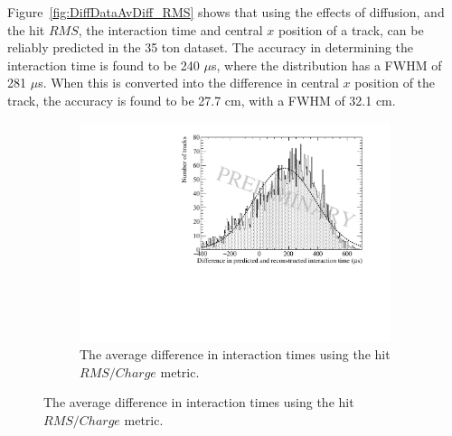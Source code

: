 Figure~\ref{fig:DiffDataAvDiff_RMS} shows that using the effects of diffusion, and the hit $RMS$, the interaction time and central $x$ position of a track, can be reliably predicted in the 35 ton dataset. The accuracy in determining the interaction time is found to be 240 $\mu$s, where the distribution has a FWHM of 281 $\mu$s. When this is converted into the difference in central $x$ position of the track, the accuracy is found to be 27.7 cm, with a FWHM of 32.1 cm. \\

\begin{figure}[h!]
  \centering
  \begin{subfigure}{0.6\textwidth}
    \centering
    \includegraphics[width=\textwidth]{Data_AvTimeDiff_RMS_Int}
    \caption{The average difference in interaction times using the hit $RMS/Charge$ metric.}
    \label{fig:DiffDataAvDiff_RMS_Int_T}
  \end{subfigure}


\end{figure}
